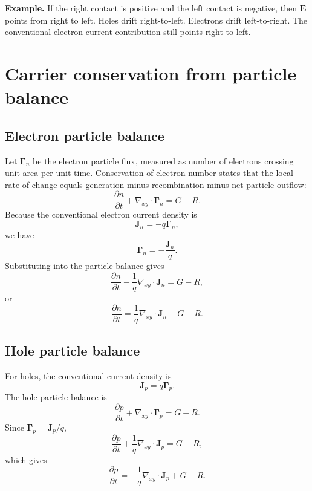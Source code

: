 \documentclass[11pt]{article}
\newcommand{\Evec}{\bm{E}}
\newcommand{\Jvec}{\bm{J}}
\newcommand{\Gammavec}{\bm{\Gamma}}
\newcommand{\divxy}{\nabla_{xy}\cdot}
\begin{document}
\begin{notebox}
\textbf{Example.} If the right contact is positive and the left contact is negative, then \(\Evec\) points from right to left. Holes drift right-to-left. Electrons drift left-to-right. The conventional electron current contribution still points right-to-left.
\end{notebox}

\section{Carrier conservation from particle balance}

\subsection{Electron particle balance}

Let \(\Gammavec_n\) be the electron particle flux, measured as number of electrons crossing unit area per unit time. Conservation of electron number states that the local rate of change equals generation minus recombination minus net particle outflow:
\begin{equation}
\frac{\partial n}{\partial t}+\divxy \Gammavec_n=G-R.
\end{equation}
Because the conventional electron current density is
\begin{equation}
\Jvec_n=-q\Gammavec_n,
\end{equation}
we have
\begin{equation}
\Gammavec_n=-\frac{\Jvec_n}{q}.
\end{equation}
Substituting into the particle balance gives
\begin{equation}
\frac{\partial n}{\partial t}-\frac{1}{q}\divxy \Jvec_n=G-R,
\end{equation}
or
\begin{equation}
\boxed{\frac{\partial n}{\partial t}=\frac{1}{q}\divxy \Jvec_n+G-R.}
\end{equation}

\subsection{Hole particle balance}

For holes, the conventional current density is
\begin{equation}
\Jvec_p=q\Gammavec_p.
\end{equation}
The hole particle balance is
\begin{equation}
\frac{\partial p}{\partial t}+\divxy \Gammavec_p=G-R.
\end{equation}
Since \(\Gammavec_p=\Jvec_p/q\),
\begin{equation}
\frac{\partial p}{\partial t}+\frac{1}{q}\divxy \Jvec_p=G-R,
\end{equation}
which gives
\begin{equation}
\boxed{\frac{\partial p}{\partial t}=-\frac{1}{q}\divxy \Jvec_p+G-R.}
\end{equation}
\end{document}
